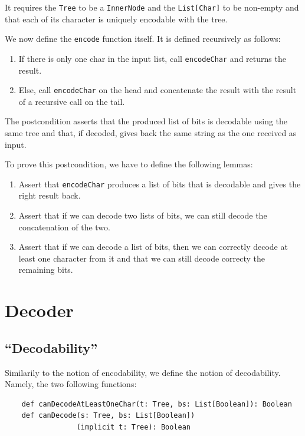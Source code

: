 \documentclass[a4paper,UKenglish,cleveref, autoref, thm-restate]{lipics-v2021}
\begin{document}
It requires the \lstinline{Tree} to be a \lstinline{InnerNode} and  the \lstinline{List[Char]} to be non-empty and that each of its character is uniquely encodable with the tree.

We now define the \lstinline{encode} function itself. It is defined recursively as follows:
\begin{enumerate}
    \item If there is only one char in the input list, call \lstinline{encodeChar} and returns the result.
    \item Else, call \lstinline{encodeChar} on the head and concatenate the result with the result of a recursive call on the tail.
\end{enumerate}

The postcondition asserts that the produced list of bits is decodable using the same tree and that, if decoded, gives back the same string as the one received as input.

To prove this postcondition, we have to define the following lemmas:
\begin{enumerate}
    \item Assert that \lstinline{encodeChar} produces a list of bits that is decodable and gives the right result back.
    \item Assert that if we can decode two lists of bits, we can still decode the concatenation of the two.
    \item Assert that if we can decode a list of bits, then we can correctly decode at least one character from it and that we can still decode correcty the remaining bits.
\end{enumerate}

\section{Decoder}

\subsection{``Decodability''}
Similarily to the notion of encodability, we define the notion of decodability. Namely, the two following functions:

\begin{lstlisting}
    def canDecodeAtLeastOneChar(t: Tree, bs: List[Boolean]): Boolean
    def canDecode(s: Tree, bs: List[Boolean])
                 (implicit t: Tree): Boolean
\end{lstlisting}
\end{document}
